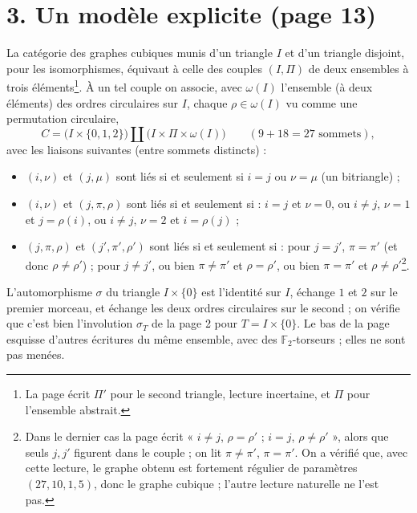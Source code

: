 \documentclass[11pt,a4paper]{article}
\begin{document}
\section*{3. Un modèle explicite (page 13)}

La catégorie des graphes cubiques munis d'un triangle $I$ et d'un triangle
disjoint, pour les isomorphismes, équivaut à celle des couples $(I, \Pi)$ de
deux ensembles à trois éléments\footnote{La page écrit $\Pi'$ pour le second
triangle, lecture incertaine, et $\Pi$ pour l'ensemble abstrait.}. À un tel
couple on associe, avec $\omega(I)$ l'ensemble (à deux éléments) des ordres
circulaires sur $I$, chaque $\rho \in \omega(I)$ vu comme une permutation
circulaire,
\[
C = \bigl(I \times \lbrace 0, 1, 2\rbrace\bigr) \amalg \bigl(I \times \Pi
\times \omega(I)\bigr) \qquad (9 + 18 = 27 \text{ sommets}),
\]
avec les liaisons suivantes (entre sommets distincts) :

\begin{itemize}
\item $(i, \nu)$ et $(j, \mu)$ sont liés si et seulement si $i = j$ ou $\nu =
  \mu$ (un bitriangle) ;
\item $(i, \nu)$ et $(j, \pi, \rho)$ sont liés si et seulement si : $i = j$ et
  $\nu = 0$, ou $i \neq j$, $\nu = 1$ et $j = \rho(i)$, ou $i \neq j$, $\nu =
  2$ et $i = \rho(j)$ ;
\item $(j, \pi, \rho)$ et $(j', \pi', \rho')$ sont liés si et seulement si :
  pour $j = j'$, $\pi = \pi'$ (et donc $\rho \neq \rho'$) ; pour $j \neq j'$,
  ou bien $\pi \neq \pi'$ et $\rho = \rho'$, ou bien $\pi = \pi'$ et $\rho \neq
  \rho'$\footnote{Dans le dernier cas la page écrit « $i \neq j$, $\rho =
  \rho'$ ; $i = j$, $\rho \neq \rho'$ », alors que seuls $j, j'$ figurent dans
  le couple ; on lit $\pi \neq \pi'$, $\pi = \pi'$. On a vérifié que, avec
  cette lecture, le graphe obtenu est fortement régulier de paramètres $(27,
  10, 1, 5)$, donc le graphe cubique ; l'autre lecture naturelle ne l'est
  pas.}.
\end{itemize}

L'automorphisme $\sigma$ du triangle $I \times \lbrace 0\rbrace$ est
l'identité sur $I$, échange $1$ et $2$ sur le premier morceau, et échange les
deux ordres circulaires sur le second ; on vérifie que c'est bien
l'involution $\sigma_T$ de la page 2 pour $T = I \times \lbrace 0\rbrace$. Le bas
de la page esquisse d'autres écritures du même ensemble, avec des
$\mathbb{F}_2$-torseurs ; elles ne sont pas menées.
\end{document}
